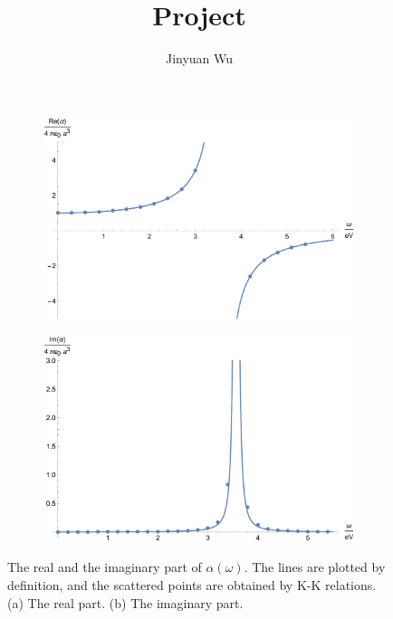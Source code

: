 \documentclass[hyperref, a4paper]{article}
\title{Project}
\author{Jinyuan Wu}
\begin{document}
\maketitle

\begin{figure}
    \centering
    \begin{subfigure}{0.45\textwidth}
        \includegraphics[width=\textwidth]{alpha-re.pdf}
        \subcaption{}
    \end{subfigure}
    \begin{subfigure}{0.45\textwidth}
        \includegraphics[width=\textwidth]{alpha-im.pdf}
        \subcaption{}
    \end{subfigure}
    \caption{The real and the imaginary part of $\alpha(\omega)$. The lines are plotted by definition, and the scattered points are obtained by K-K relations. (a) The real part. (b) The imaginary part.}
    \label{fig:plot}
\end{figure}
\end{document}

